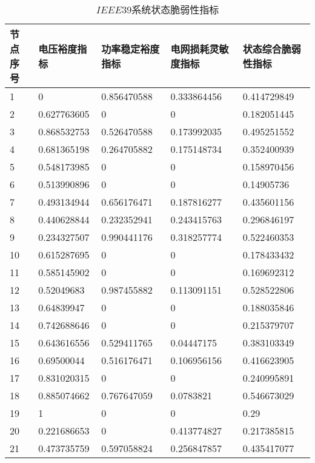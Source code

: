 \begin{table}[H]
  \centering
  \caption{$IEEE39$系统状态脆弱性指标}
  \label{tab:chap5:Index2_frabric39}
  \begin{tabular}{C{1.5cm}C{2.5cm}C{2.5cm}C{2.75cm}C{2.75cm}}
  \toprule
  \textbf{节点序号} & \textbf{电压裕度指标} & \textbf{功率稳定裕度指标} & \textbf{电网损耗灵敏度指标} & \textbf{状态综合脆弱性指标} \\
   & 0           & 0.856470588 & 0.333864456 & 0.414729849 \\
  2 & 0.627763605 & 0           & 0           & 0.182051445 \\ 
  3 & 0.868532753 & 0.526470588 & 0.173992035 & 0.495251552 \\ 
  4 & 0.681365198 & 0.264705882 & 0.175148734 & 0.352400939 \\
  5 & 0.548173985 & 0           & 0           & 0.158970456 \\ 
  6 & 0.513990896 & 0           & 0           & 0.14905736 \\ 
  7 & 0.493134944 & 0.656176471 & 0.187816277 & 0.435601156 \\ 
  8 & 0.440628844 & 0.232352941 & 0.243415763 & 0.296846197 \\ 
  9 & 0.234327507 & 0.990441176 & 0.318257774 & 0.522460353 \\ 
  10 & 0.615287695 & 0          & 0           & 0.178433432 \\ 
  11 & 0.585145902 & 0          & 0           & 0.169692312 \\
  12 & 0.52049683  & 0.987455882 & 0.113091151 & 0.528522806 \\ 
  13 & 0.64839947  & 0           & 0           & 0.188035846 \\ 
  14 & 0.742688646 & 0           & 0           & 0.215379707 \\
  15 & 0.643616556 & 0.529411765 & 0.04447175  & 0.383103349 \\ 
  16 & 0.69500044  & 0.516176471 & 0.106956156 & 0.416623905 \\ 
  17 & 0.831020315 & 0           & 0           & 0.240995891 \\ 
  18 & 0.885074662 & 0.767647059 & 0.0783821   & 0.546673029 \\ 
  19 & 1           & 0           & 0           & 0.29 \\ 
  20 & 0.221686653 & 0           & 0.413774827 & 0.217385815 \\ 
  21 & 0.473735759 & 0.597058824 & 0.256847857 & 0.435417077 \\ 

\end{tabular}
\end{table}
